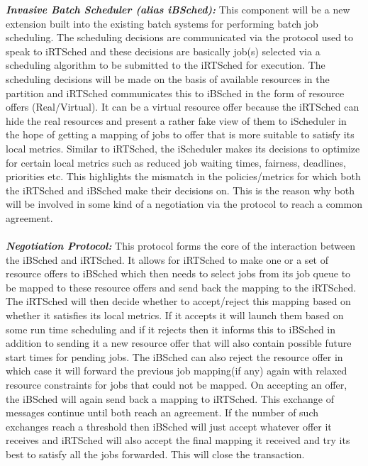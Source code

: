 \textbf{\textit{Invasive Batch Scheduler (alias iBSched):}} This component will be a new extension built into the existing batch systems for performing batch job scheduling. The scheduling decisions are communicated via the protocol used to speak to iRTSched and these decisions are basically job(s) selected via a scheduling algorithm to be submitted to the iRTSched for execution. The scheduling decisions will be made on the basis of available resources in the partition and iRTSched communicates this to iBSched in the form of resource offers (Real/Virtual). It can be a virtual resource offer because the iRTSched can hide the real resources and present a rather fake view of them to iScheduler in the hope of getting a mapping of jobs to offer that is more suitable to satisfy its local metrics. Similar to iRTSched, the iScheduler makes its decisions to optimize for certain local metrics such as reduced job waiting times, fairness, deadlines, priorities etc. This highlights the mismatch in the policies/metrics for which both the iRTSched and iBSched make their decisions on. This is the reason why both will be involved in some kind of a negotiation via the protocol to reach a common agreement.\\ \\
\textbf{\textit{Negotiation Protocol:}} This protocol forms the core of the interaction between the iBSched and iRTSched. It allows for iRTSched to make one or a set of resource offers to iBSched which then needs to select jobs from its job queue to be mapped to these resource offers and send back the mapping to the iRTSched. The iRTSched will then decide whether to accept/reject this mapping based on whether it satisfies its local metrics. If it accepts it will launch them based on some run time scheduling and if it rejects then it informs this to iBSched in addition to sending it a new resource offer that will also contain possible future start times for pending jobs. The iBSched can also reject the resource offer in which case it will forward the previous job mapping(if any) again with relaxed resource constraints for jobs that could not be mapped. On accepting an offer, the iBSched will again send back a mapping to iRTSched. This exchange of messages continue until both reach an agreement. If the number of such exchanges reach a threshold then iBSched will just accept whatever offer it receives and iRTSched will also accept the final mapping it received and try its best to satisfy all the jobs forwarded. This will close the transaction.\\ \\
